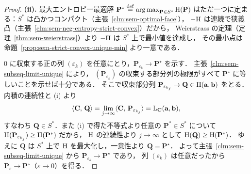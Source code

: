 \begin{proof}
  \textbf{(ii).}
  最大エントロピー最適解 $\mathbf{P}^\star \overset{\mathrm{def}}{=} \operatorname*{arg\,max}_{\mathbf{P} \in S^*}\mathrm{H}(\mathbf{P})$
  はただ一つに定まる：$S^*$ は凸かつコンパクト（主張~\ref{clm:sem-optimal-face}），
  $-\mathrm{H}$ は連続で狭義凸（主張~\ref{clm:sem-neg-entropy-strict-convex}）だから，
  Weierstrass の定理（定理~\ref{thm:sem-weierstrass}）より $-\mathrm{H}$ は $S^*$ 上で最小値を達成し，
  その最小点は命題~\ref{prop:sem-strict-convex-unique-min} より一意である．

  $0$ に収束する正の列 $(\varepsilon_k)$ を任意にとり，$\mathbf{P}_{\varepsilon_k} \to \mathbf{P}^\star$ を示す．
  主張~\ref{clm:sem-subseq-limit-unique} により，
  $(\mathbf{P}_{\varepsilon_k})$ の収束する部分列の極限がすべて $\mathbf{P}^\star$ に等しいことを示せば十分である．
  そこで収束部分列 $\mathbf{P}_{\varepsilon_{k_j}} \to \mathbf{Q} \in \Pi(\mathbf{a},\mathbf{b})$ をとる．
  内積の連続性と (i) より
  \[
    \langle \mathbf{C},\, \mathbf{Q} \rangle
    = \lim_{j\to\infty}\langle \mathbf{C},\, \mathbf{P}_{\varepsilon_{k_j}} \rangle
    = \mathrm{L}_{\mathbf{C}}(\mathbf{a},\mathbf{b}),
  \]
  すなわち $\mathbf{Q} \in S^*$．また (i) で得た不等式より任意の $\mathbf{P}^* \in S^*$ について
  $\mathrm{H}(\mathbf{P}_{\varepsilon_{k_j}}) \geq \mathrm{H}(\mathbf{P}^*)$ だから，
  $\mathrm{H}$ の連続性より $j\to\infty$ として $\mathrm{H}(\mathbf{Q}) \geq \mathrm{H}(\mathbf{P}^*)$．
  ゆえに $\mathbf{Q}$ は $S^*$ 上で $\mathrm{H}$ を最大化し，一意性より $\mathbf{Q} = \mathbf{P}^\star$．
  よって主張~\ref{clm:sem-subseq-limit-unique} から $\mathbf{P}_{\varepsilon_k} \to \mathbf{P}^\star$ であり，
  列 $(\varepsilon_k)$ は任意だったから $\mathbf{P}_\varepsilon \to \mathbf{P}^\star$（$\varepsilon \to 0$）を得る．


\end{proof}
